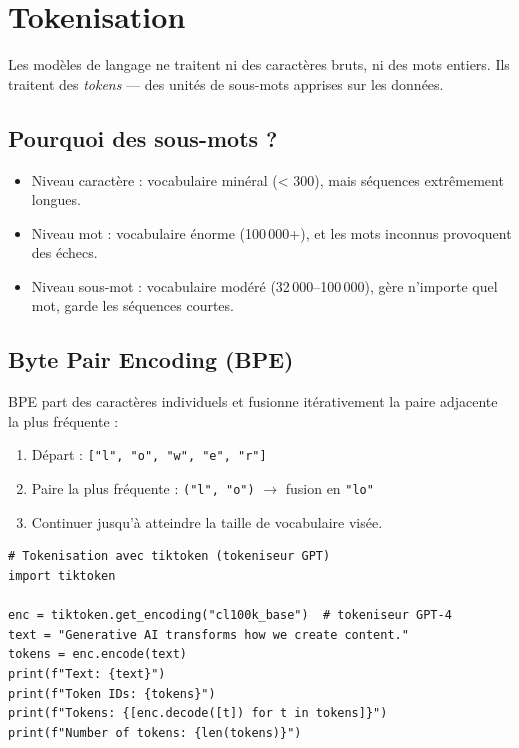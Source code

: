 \section{Tokenisation}

Les mod\`eles de langage ne traitent ni des caract\`eres bruts, ni des mots entiers. Ils traitent des \emph{tokens} --- des unit\'es de sous-mots apprises sur les donn\'ees.

\subsection{Pourquoi des sous-mots ?}

\begin{itemize}
  \item Niveau caract\`ere : vocabulaire min\'eral (< 300), mais s\'equences extr\^emement longues.
  \item Niveau mot : vocabulaire \'enorme (100\,000+), et les mots inconnus provoquent des \'echecs.
  \item Niveau sous-mot : vocabulaire mod\'er\'e (32\,000--100\,000), g\`ere n'importe quel mot, garde les s\'equences courtes.
\end{itemize}

\subsection{Byte Pair Encoding (BPE)}

BPE part des caract\`eres individuels et fusionne it\'erativement la paire adjacente la plus fr\'equente :

\begin{enumerate}
  \item D\'epart : \texttt{["l", "o", "w", "e", "r"]}
  \item Paire la plus fr\'equente : \texttt{("l", "o")} $\rightarrow$ fusion en \texttt{"lo"}
  \item Continuer jusqu'\`a atteindre la taille de vocabulaire vis\'ee.
\end{enumerate}

\begin{verbatim}
# Tokenisation avec tiktoken (tokeniseur GPT)
import tiktoken

enc = tiktoken.get_encoding("cl100k_base")  # tokeniseur GPT-4
text = "Generative AI transforms how we create content."
tokens = enc.encode(text)
print(f"Text: {text}")
print(f"Token IDs: {tokens}")
print(f"Tokens: {[enc.decode([t]) for t in tokens]}")
print(f"Number of tokens: {len(tokens)}")
\end{verbatim}

